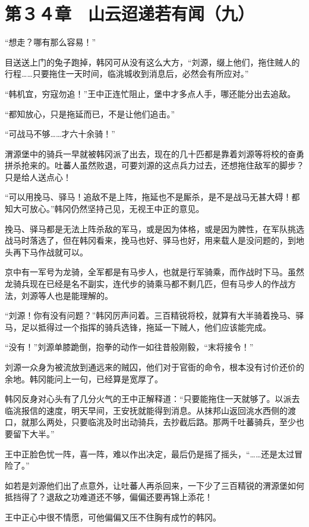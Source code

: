 \section{第３４章　山云迢递若有闻（九）}

“想走？哪有那么容易！”

目送送上门的兔子跑掉，韩冈可从没有这么大方，“刘源，缀上他们，拖住贼人的行程……只要拖住一天时间，临洮城收到消息后，必然会有所应对。”

“韩机宜，穷寇勿追！”王中正连忙阻止，堡中才多点人手，哪还能分出去追敌。

“都知放心，只是拖延而已，不是让他们追击。”

“可战马不够……才六十余骑！”

渭源堡中的骑兵一早就被韩冈派了出去，现在的几十匹都是靠着刘源等将校的奋勇拼杀抢来的。吐蕃人虽然败退，可要刘源的这点兵力过去，还想拖住敌军的脚步？只是给人送点心！

“可以用挽马、驿马！追敌不是上阵，拖延也不是厮杀，是不是战马无甚大碍！都知大可放心。”韩冈仍然坚持己见，无视王中正的意见。

挽马、驿马都是无法上阵杀敌的军马，或是因为体格，或是因为脾性，在军队挑选战马时落选了，但在韩冈看来，挽马也好、驿马也好，用来载人是没问题的，到地头再下马作战就可以。

京中有一军号为龙骑，全军都是有马步人，也就是行军骑乘，而作战时下马。虽然龙骑兵现在已经是名不副实，连代步的骑乘马都不剩几匹，但有马步人的作战方法，刘源等人也是能理解的。

“刘源！你有没有问题？”韩冈厉声问着。三百精锐将校，就算有大半骑着挽马、驿马，足以抵得过一个指挥的骑兵选锋，拖延一下贼人，他们应该能完成。

“没有！”刘源单膝跪倒，抱拳的动作一如往昔般刚毅，“末将接令！”

刘源一众身为被流放到通远来的贼囚，他们对于官衙的命令，根本没有讨价还价的余地。韩冈能问上一句，已经算是宽厚了。

韩冈反身对心头有了几分火气的王中正解释道：“只要能拖住一天就够了。以派去临洮报信的速度，明天早间，王安抚就能得到消息。从抹邦山返回洮水西侧的渡口，就那么两处，只要临洮及时出动骑兵，去抄截后路。那两千吐蕃骑兵，至少也要留下大半。”

王中正脸色忧一阵，喜一阵，难以作出决定，最后仍是摇了摇头，“……还是太过冒险了。”

如若是刘源他们出了点意外，让吐蕃人再杀回来，一下少了三百精锐的渭源堡如何抵挡得了？退敌之功难道还不够，偏偏还要再锦上添花！

王中正心中很不情愿，可他偏偏又压不住胸有成竹的韩冈。

